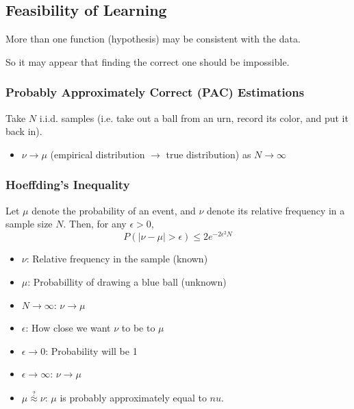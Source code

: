 \subsection{Feasibility of Learning}
\begin{motivation}
    More than one function (hypothesis) may be consistent with the data.
\end{motivation}

\begin{notes}
    So it may appear that finding the correct one should be impossible. 
\end{notes}

\subsubsection{Probably Approximately Correct (PAC) Estimations}
\begin{example}
    Take $N$ i.i.d. samples (i.e. take out a ball from an urn, record its color, and put it back in).
    \begin{itemize}
        \item $\nu \rightarrow \mu$ (empirical distribution $\rightarrow$ true distribution) as $N \rightarrow \infty$
    \end{itemize}
\end{example}

\subsubsection{Hoeffding's Inequality}
\begin{definition}
    Let $\mu$ denote the probability of an event, and $\nu$ denote its relative frequency in a sample size $N$. Then, for any $\epsilon > 0$,
    \begin{equation}
        P(|\nu - \mu| > \epsilon) \leq 2e^{-2\epsilon^2N}
    \end{equation}
    \begin{itemize}
        \item $\nu$: Relative frequency in the sample (known)
        \item $\mu$: Probabillity of drawing a blue ball (unknown)
        \item $N \rightarrow \infty$: $\nu \rightarrow \mu$
        \item $\epsilon$: How close we want $\nu$ to be to $\mu$
        \item $\epsilon \rightarrow 0$: Probability will be 1
        \item $\epsilon \rightarrow \infty$: $\nu \rightarrow \mu$
        \item $\mu \overset{?}{\approx} \nu $: $\mu$ is probably approximately equal to $nu$.
    \end{itemize}
\end{definition}

